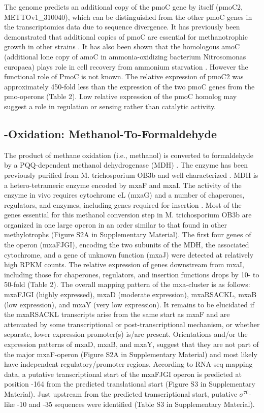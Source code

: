 The genome predicts an additional copy of the pmoC gene by itself (pmoC2, METTOv1\_310040), which can be distinguished from the other pmoC genes in the transcriptomics data due to sequence divergence.
It has previously been demonstrated that additional copies of pmoC are essential for methanotrophic growth in other strains \cite{stolyar1999, dam2012a}.
It has also been shown that the homologous amoC (additional lone copy of amoC in ammonia-oxidizing bacterium Nitrosomonas europaea) plays role in cell recovery from ammonium starvation \cite{berube2012}.
However the functional role of PmoC is not known.
The relative expression of pmoC2 was approximately 450-fold less than the expression of the two pmoC genes from the pmo-operons (Table 2).
Low relative expression of the pmoC homolog may suggest a role in regulation or sensing rather than catalytic activity.

\subsection{-Oxidation: Methanol-To-Formaldehyde}
The product of methane oxidation (i.e., methanol) is converted to formaldehyde by a PQQ-dependent methanol dehydrogenase (MDH) \cite{anthony1982, anthony2002, yamada1992, anthony1994}. %
The enzyme has been previously purified from M. trichosporium OB3b and well characterized \cite{yamada1992}.  %
MDH is a hetero-tetrameric enzyme encoded by mxaF and mxaI.
The activity of the enzyme in vivo requires cytochrome cL (mxaG) and a number of chaperones, regulators, and enzymes, including genes required for  insertion \cite{anthony1994, anthony2002}.
Most of the genes essential for this methanol conversion step in M. trichosporium OB3b are organized in one large operon in an order similar to that found in other methylotrophs (Figure S2A in Supplementary Material).
The first four genes of the operon (mxaFJGI), encoding the two subunits of the MDH, the associated cytochrome, and a gene of unknown function (mxaJ) were detected at relatively high RPKM counts.
The relative expression of genes downstream from mxaI, including those for chaperones, regulators, and  insertion functions drops by 10- to 50-fold (Table 2).
The overall mapping pattern of the mxa-cluster is as follows: mxaFJGI (highly expressed), mxaD (moderate expression), mxaRSACKL, mxaB (low expression), and mxaY (very low expression).
It remains to be elucidated if the mxaRSACKL transcripts arise from the same start as mxaF and are attenuated by some transcriptional or post-transcriptional mechanism, or whether separate, lower expression promoter(s) is/are present.
Orientations and/or the expression patterns of mxaD, mxaB, and mxaY, suggest that they are not part of the major mxaF-operon (Figure S2A in Supplementary Material) and most likely have independent regulatory/promoter regions.
According to RNA-seq mapping data, a putative transcriptional start of the mxaFJGI operon is predicted at position -164 from the predicted translational start (Figure S3 in Supplementary Material).
Just upstream from the predicted transcriptional start, putative $\sigma^{70}$-like -10 and -35 sequences were identified (Table S3 in Supplementary Material).

